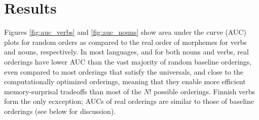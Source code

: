 \documentclass[11pt,letterpaper]{article}
\newcommand{\citet}{\Textcite}
\newcommand\mhahn[1]{{\color{red}(#1)}}
\newcommand\becky[1]{{\color{blue}(#1)}}
\begin{document}



\section{Results}


Figures \ref{fig:auc_verbs} and \ref{fig:auc_nouns} show area under the curve (AUC) plots for random orders as compared to the real order of morphemes for verbs and nouns, respectively.
In most languages, and for both nouns and verbs, real orderings have lower AUC than the vast majority of random baseline orderings, even compared to most orderings that satisfy the universals, and close to the computationally optimized orderings, meaning that they enable more efficient memory-surprisal tradeoffs than most of the $N!$ possible orderings.
Finnish verbs form the only ecxception; AUCs of real orderings are similar to those of baseline orderings (see below for discussion).
\end{document}
